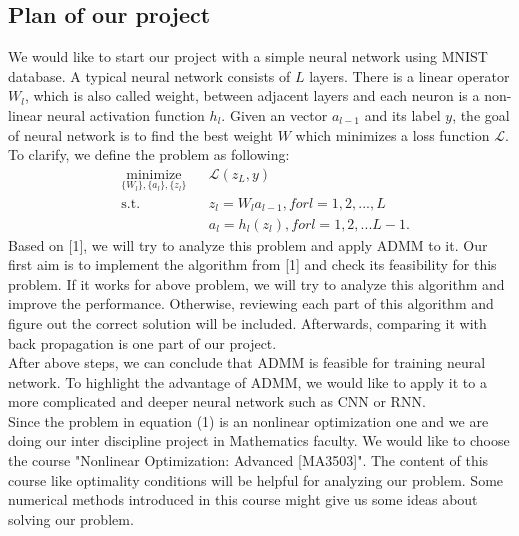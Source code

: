 \documentclass[11pt]{report}
\begin{document}
\subsection*{Plan of our project}
We would like to start our project with a simple neural network using MNIST database. A typical neural network consists of $L$ layers. There is a linear operator $W_l$, which is also called weight, between adjacent layers and each neuron is a non-linear neural activation function $h_l$. Given an vector $a_{l-1}$ and its label $y$, the goal of neural network is to find the best weight $W$ which minimizes a loss function $\mathcal{L}$. To clarify, we define the problem as following:
\begin{equation}
\begin{aligned}
& \underset{\{W_l\},\{a_l\}, \{z_l\}}{\text{minimize}}
& & \mathcal{L}(z_L,y) \\
& \text{s.t.}
& & z_l = W_la_{l-1}, for l = 1,2,...,L \\
& & & a_l = h_l(z_l), for l = 1,2,...L-1.
\end{aligned}
\end{equation}
Based on [1], we will try to analyze this problem and apply ADMM to it. Our first aim is to implement the algorithm from [1] and check its feasibility for this problem. If it works for above problem, we will try to analyze this algorithm and  improve the performance. Otherwise, reviewing each part of this algorithm and figure out the correct solution will be included. Afterwards, comparing it with back propagation is one part of our project.\\
After above steps, we can conclude that ADMM is feasible for training neural network. To highlight the advantage of ADMM, we would like to apply it to a more complicated and deeper neural network such as CNN or RNN.\\
Since the problem in equation (1) is an nonlinear optimization one and we are doing our inter discipline project in Mathematics faculty. We would like to choose the course "Nonlinear Optimization: Advanced [MA3503]". The content of this course like optimality conditions will be helpful for analyzing our problem. Some numerical methods introduced in this course might give us some ideas about solving our problem.
\end{document}
